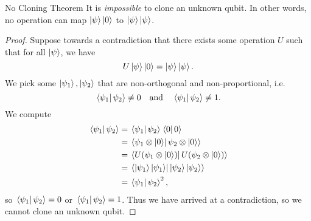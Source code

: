 \documentclass[class=article, crop=false]{standalone}
\begin{document}
  \begin{theorem}{No Cloning Theorem}
    It is \emph{impossible} to clone an unknown qubit. In other words, no operation can map $\ket{\psi}\ket{0}$ to $\ket{\psi}\ket{\psi}$.
    \begin{proof}
      Suppose towards a contradiction that there exists some operation $U$ such that for all $\ket{\psi}$, we have
      \[
        U\ket{\psi}\ket{0} = \ket{\psi}\ket{\psi}.
      \]
      We pick some $\ket{\psi_1}, \ket{\psi_2}$ that are non-orthogonal and non-proportional, i.e.
      \[
        \braket{\psi_1}{\psi_2}\neq 0\quad\text{and}\quad \braket{\psi_1}{\psi_2}\neq 1.
      \]
      We compute
      \begin{align*}
        \braket{\psi_1}{\psi_2} &= \braket{\psi_1}{\psi_2}\braket{0}{0} \\
                                &= \braket{\psi_1\otimes \ket{0}}{\psi_2\otimes \ket{0}} \\
                                &= \braket{U(\psi_1\otimes \ket{0})}{U(\psi_2\otimes \ket{0})} \\
                                &= \braket{\ket{\psi_1}\ket{\psi_1}}{\ket{\psi_2}\ket{\psi_2}} \\
                                &= \braket{\psi_1}{\psi_2}^2,
      \end{align*}
      so $\braket{\psi_1}{\psi_2} = 0$ or $\braket{\psi_1}{\psi_2} = 1$. Thus we have arrived at a contradiction, so we cannot clone an unknown qubit.
    \end{proof}
  \end{theorem}
\end{document}
